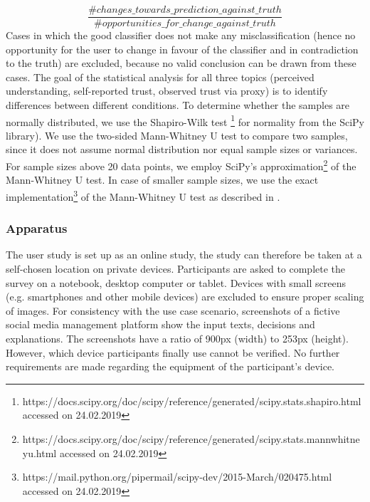 \[ \frac{\#changes\_towards\_prediction\_against\_truth}{\#opportunities\_for\_change\_against\_truth} \]
Cases in which the good classifier does not make any misclassification (hence no opportunity for the user to change in favour of the classifier and in contradiction to the truth) are excluded, because no valid conclusion can be drawn from these cases.\newline
The goal of the statistical analysis for all three topics (perceived understanding, self-reported trust, observed trust via proxy) is to identify differences between different conditions. To determine whether the samples are normally distributed, we use the Shapiro-Wilk test \footnote{https://docs.scipy.org/doc/scipy/reference/generated/scipy.stats.shapiro.html accessed on 24.02.2019} for normality from the SciPy library). We use the two-sided Mann-Whitney U test to compare two samples, since it does not assume normal distribution nor equal sample sizes or variances. For sample sizes above 20 data points, we employ SciPy's approximation\footnote{https://docs.scipy.org/doc/scipy/reference/generated/scipy.stats.mannwhitneyu.html accessed on 24.02.2019} of the Mann-Whitney U test. In case of smaller sample sizes, we use the exact implementation\footnote{https://mail.python.org/pipermail/scipy-dev/2015-March/020475.html accessed on 24.02.2019} of the Mann-Whitney U test as described in \cite{cheung1997mann}.

\subsubsection{Apparatus}
The user study is set up as an online study, the study can therefore be taken at a self-chosen location on private devices. Participants are asked to complete the survey on a notebook, desktop computer or tablet. Devices with small screens (e.g. smartphones and other mobile devices) are excluded to ensure proper scaling of images. For consistency with the use case scenario, screenshots of a fictive social media management platform show the input texts, decisions and explanations. The screenshots have a ratio of 900px (width) to 253px (height). However, which device participants finally use cannot be verified. No further requirements are made regarding the equipment of the participant's device.

